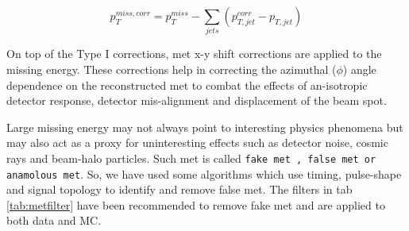 \begin{equation}
\label{eqn:metcorr}
p_{T}^{miss, corr} = p_{T}^{miss} - \sum_{jets}\left(p_{T, jet}^{corr}-p_{T, jet}\right)
\end{equation}

On top of the Type I corrections, met x-y shift corrections \cite{metxy} are applied to the missing energy. These corrections help in correcting the azimuthal ($\phi$) angle dependence on the reconstructed met to combat the effects of an-isotropic detector response, detector mis-alignment and displacement of the beam spot. 

Large missing energy may not always point to interesting physics phenomena but may also act as a proxy for uninteresting effects such as detector noise, cosmic rays and beam-halo particles. Such met is called \verb|fake met , false met or anamolous met|. So, we have used some algorithms which use timing, pulse-shape and signal topology to identify and remove false met. The filters \cite{metfilters} in tab \ref{tab:metfilter} have been recommended to remove fake met and are applied to both data and MC.

